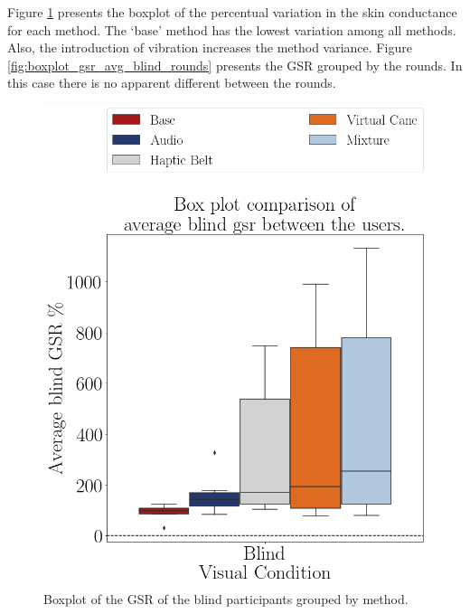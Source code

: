 Figure \ref{fig:boxplot_gsr_avg_blind_scene} presents the boxplot of the percentual variation in the skin conductance for each method. The ‘base’ method has the lowest variation among all methods. Also, the introduction of vibration increases the method variance. Figure \ref{fig:boxplot_gsr_avg_blind_rounds} presents the GSR grouped by the rounds. In this case there is no apparent different between the rounds.

\begin{figure}[!htb]
    \centering
    \begin{minipage}{0.45\textwidth}
        \centering
        \includegraphics[width = 0.8\linewidth]{Resultados/GSR/Figuras/png/boxplot_gsr_avg_blind_scene.png}
        \caption{Boxplot of the GSR of the blind participants grouped by method.}
        \label{fig:boxplot_gsr_avg_blind_scene}
    \end{minipage}
    \begin{minipage}{0.45\textwidth}
        \centering

\end{minipage}
\end{figure}
